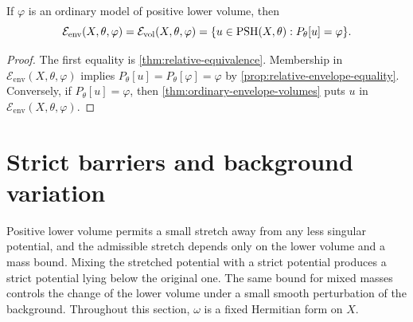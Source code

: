 \begin{corollary}\label{cor:full-mass-envelope-characterization}
If $\varphi$ is an ordinary model of positive lower volume, then
\[
 \mathcal E_{\mathrm{env}}(X,\theta,\varphi)
 =\mathcal E_{\mathrm{vol}}(X,\theta,\varphi)
 =\{u\in\mathrm{PSH}(X,\theta):P_\theta[u]=\varphi\}.
\]
\end{corollary}
\begin{proof}
The first equality is \cref{thm:relative-equivalence}. Membership in $\mathcal E_{\mathrm{env}}(X,\theta,\varphi)$ implies $P_\theta[u]=P_\theta[\varphi]=\varphi$ by \cref{prop:relative-envelope-equality}. Conversely, if $P_\theta[u]=\varphi$, then \cref{thm:ordinary-envelope-volumes} puts $u$ in $\mathcal E_{\mathrm{env}}(X,\theta,\varphi)$.
\end{proof}



\section{Strict barriers and background variation}
\label{sec:positive-volume-barriers}

Positive lower volume permits a small stretch away from any less singular potential, and the admissible stretch depends only on the lower volume and a mass bound. Mixing the stretched potential with a strict potential produces a strict potential lying below the original one. The same bound for mixed masses controls the change of the lower volume under a small smooth perturbation of the background. Throughout this section, $\omega$ is a fixed Hermitian form on $X$.


